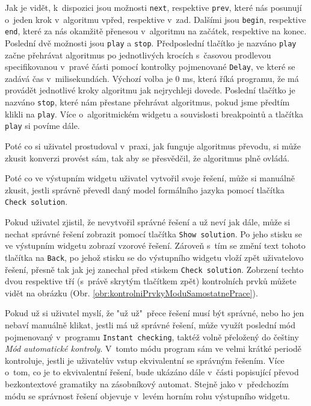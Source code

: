 Jak je vidět, k~dispozici jsou možnosti \texttt{next}, respektive \texttt{prev}, které nás posunují o~jeden krok v~algoritmu vpřed, respektive v~zad. Dalšími jsou \texttt{begin}, respektive \texttt{end}, které za nás okamžitě přenesou v~algoritmu na začátek, respektive na konec. Poslední dvě možnosti jsou \texttt{play} a \texttt{stop}. Předposlední tlačítko je nazváno \texttt{play} začne přehrávat algoritmus po jednotlivých krocích s~časovou prodlevou specifikovanou v~pravé části pomocí kontrolky pojmenované \texttt{Delay}, ve které se zadává čas v~milisekundách. Výchozí volba je 0 ms, která říká programu, že má provádět jednotlivé kroky algoritmu jak nejrychleji dovede. Poslední tlačítko je nazváno \texttt{stop}, které nám přestane přehrávat algoritmus, pokud jsme předtím klikli na \texttt{play}. Více o~algoritmickém widgetu a souvislosti breakpointů a tlačítka \texttt{play} si povíme dále.


Poté co si uživatel prostudoval v~praxi, jak funguje algoritmus převodu, si může zkusit konverzi provést sám, tak aby se přesvědčil, že algoritmus plně ovládá. 

Poté co ve výstupním widgetu uživatel vytvořil svoje řešení, může si manuálně zkusit, jestli správně převedl daný model formálního jazyka pomocí tlačítka \texttt{Check solution}. 

Pokud uživatel zjistil, že nevytvořil správné řešení a už neví jak dále, může si nechat správné řešení zobrazit pomocí tlačítka \texttt{Show solution}. Po jeho stisku se ve výstupním widgetu zobrazí vzorové řešení. Zároveň s~tím se změní text tohoto tlačítka na \texttt{Back}, po jehož stisku se do výstupního widgetu vloží zpět uživatelovo řešení, přesně tak jak jej zanechal před stiskem \texttt{Check solution}. Zobrzení techto dvou respektive tří (s~právě skrytým tlačítkem zpět) kontrolních prvků můžete vidět na obrázku (Obr. \ref{obr:kontrolniPrvkyModuSamostatnePrace}).



Pokud už si uživatel myslí, že "už už"\ přece řešení musí být správné, nebo ho jen nebaví manuálně klikat, jestli má už správné řešení, může využít poslední mód pojmenovaný v~programu \texttt{Instant checking}, taktéž volně přeložený do češtiny \textit{Mód automatické kontroly}. V~tomto módu program sám ve velmi krátké periodě kontroluje, jestli je uživatelův vstup ekvivalentní se správným řešením. Více o~tom, co je to ekvivalentní řešení, bude ukázáno dále v~části popisující převod bezkontextové gramatiky na zásobníkový automat. Stejně jako v~předchozím módu se správnost řešení objevuje v~levém horním rohu výstupního widgetu. 


